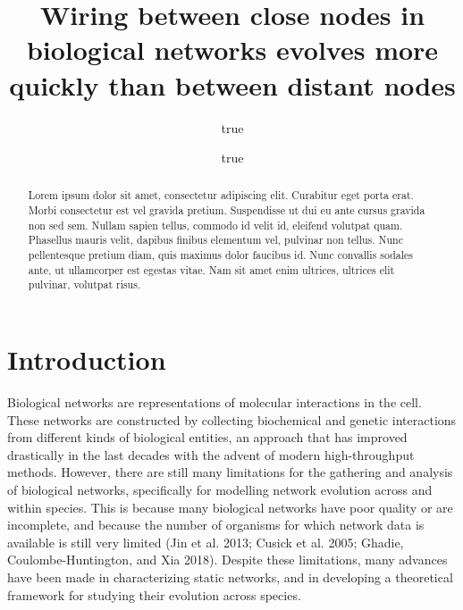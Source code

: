 \documentclass[
]{article}
\title{Wiring between close nodes in biological networks evolves more quickly than between distant nodes}
\author{true \and true}
\date{}
\begin{document}
\maketitle
\begin{abstract}
Lorem ipsum dolor sit amet, consectetur adipiscing elit. Curabitur eget porta erat. Morbi consectetur est vel gravida pretium. Suspendisse ut dui eu ante cursus gravida non sed sem. Nullam sapien tellus, commodo id velit id, eleifend volutpat quam. Phasellus mauris velit, dapibus finibus elementum vel, pulvinar non tellus. Nunc pellentesque pretium diam, quis maximus dolor faucibus id. Nunc convallis sodales ante, ut ullamcorper est egestas vitae. Nam sit amet enim ultrices, ultrices elit pulvinar, volutpat risus.
\end{abstract}

{
\setcounter{tocdepth}{2}
\tableofcontents
}
\hypertarget{introduction}{%
\section{Introduction}\label{introduction}}

Biological networks are representations of molecular interactions in the cell. These networks are constructed by collecting biochemical and genetic interactions from different kinds of biological entities, an approach that has improved drastically in the last decades with the advent of modern high-throughput methods. However, there are still many limitations for the gathering and analysis of biological networks, specifically for modelling network evolution across and within species. This is because many biological networks have poor quality or are incomplete, and because the number of organisms for which network data is available is still very limited (Jin et al. 2013; Cusick et al. 2005; Ghadie, Coulombe-Huntington, and Xia 2018). Despite these limitations, many advances have been made in characterizing static networks, and in developing a theoretical framework for studying their evolution across species.
\end{document}

